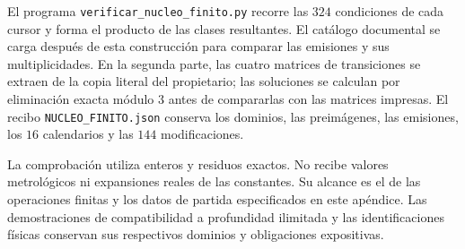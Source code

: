 El programa \texttt{verificar\_nucleo\_finito.py} recorre las $324$
condiciones de cada cursor y forma el producto de las clases resultantes.
El catálogo documental se carga después de esta construcción para
comparar las emisiones y sus multiplicidades. En la segunda parte,
las cuatro matrices de transiciones se extraen de la copia literal
del propietario; las soluciones se calculan por eliminación exacta
módulo $3$ antes de compararlas con las matrices impresas. El recibo
\texttt{NUCLEO\_FINITO.json} conserva los dominios, las preimágenes,
las emisiones, los $16$ calendarios y las $144$ modificaciones.

La comprobación utiliza enteros y residuos exactos. No recibe valores
metrológicos ni expansiones reales de las constantes. Su alcance
es el de las operaciones finitas y los datos de partida especificados
en este apéndice. Las demostraciones de compatibilidad a profundidad
ilimitada y las identificaciones físicas conservan sus respectivos
dominios y obligaciones expositivas.
